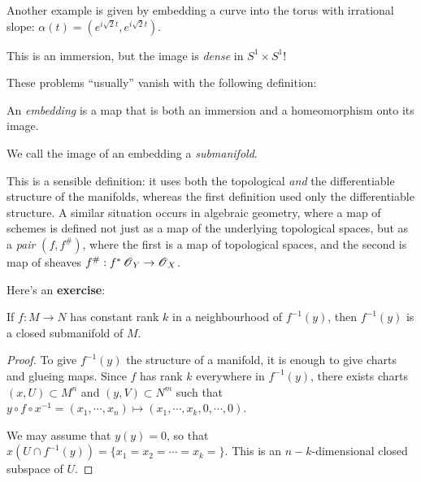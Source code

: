 \documentclass[11pt, english]{article}
\begin{document}
\begin{example}
Another example is given by embedding a curve into the torus with irrational slope: $\alpha(t)=\left( e^{i\sqrt{2}t},e^{i\sqrt{2}t}\right)$.

This is an immersion, but the image is \emph{dense} in $S^1 \times S^1$!
\end{example}

These problems ``usually'' vanish with the following definition:
\begin{defi}
An \emph{embedding} is a map that is both an immersion and a homeomorphism onto its image.
\end{defi}
We call the image of an embedding a \emph{submanifold}.
\begin{remark}
This is a sensible definition: it uses both the topological \emph{and} the differentiable structure of the manifolds, whereas the first definition used only the differentiable structure. A similar situation occurs in algebraic geometry, where a map of schemes is defined not just as a map of the underlying topological spaces, but as a \emph{pair} $(f,f^{\#})$, where the first is a map of topological spaces, and the second is map of sheaves $f^{\#}:f^\ast \operatorname{\mathscr{O}}_Y \to \operatorname{\mathscr{O}}_X$.
\end{remark}

Here's an \textbf{exercise}:
\begin{prop}
\label{proprank}
If $f:M \to N$ has constant rank $k$ in a neighbourhood of $f^{-1}(y)$, then $f^{-1}(y)$ is a closed submanifold of $M$.
\end{prop}
\begin{proof}
To give $f^{-1}(y)$ the structure of a manifold, it is enough to give charts and glueing maps. Since $f$ has rank $k$ everywhere in $f^{-1}(y)$, there exists charts $(x,U) \subset M^n$ and $(y,V) \subset N^m$ such that $y \circ f \circ x^{-1} = (x_1,\cdots,x_n) \mapsto (x_1,\cdots,x_k,0,\cdots,0)$.

We may assume that $y(y)=0$, so that $x(U \cap f^{-1}(y)) = \{ x_1 = x_2 = \cdots = x_k = \}$. This is an $n-k$-dimensional closed subspace of $U$.
\end{proof}
\end{document}
